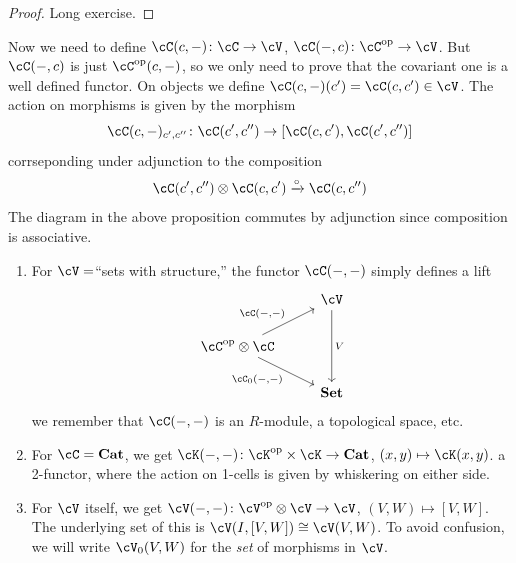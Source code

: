 \documentclass[a4paper,11pt,oneside,openany]{scrbook}
\begin{document}
\begin{proof}
	Long exercise.
\end{proof}
Now we need to define $ \cC(c,-) \from \cC \to \cV $, $ \cC(-,c)\from \cC^{\op}\to \cV $.
But $ \cC(-,c) $ is just $ \cC^{\op}(c,-) $, so we only need to prove that the covariant one is a well defined functor.
On objects we define $ \cC(c,-)(c') = \cC(c,c') \in \cV $.
The action on morphisms is given by the morphism
\begin{displaymath}
	\cC(c,-)_{c',c''} \from \cC(c',c'') \to [\cC(c,c'),\cC(c',c'')]
\end{displaymath}
corrseponding under adjunction to the composition
\begin{displaymath}
	\cC(c',c'')\otimes \cC(c,c') \xrightarrow{\circ} \cC(c,c'')
\end{displaymath}
The diagram in the above proposition commutes by adjunction since composition is associative.
\begin{exmp}
	\begin{enumerate}[label=\arabic*)]
		\item
		      For $ \cV =  $``sets with structure,'' the functor $ \cC(-,-) $ simply defines a lift
		      \begin{displaymath}
			      \begin{tikzcd}
				      & \cV \arrow[dd, "V"]\\
				      \cC^{\op}\otimes \cC \arrow[ur, "{\cC(-,-)}"]\arrow[dr, "{\cC_0(-,-)}"'] & \\
				      & \Set
			      \end{tikzcd}
		      \end{displaymath}
		      we remember that $ \cC(-,-) $ is an $ R $-module, a topological space, etc.
		\item
		      For $ \cC = \Cat $, we get $ \cK(-,-) \from \cK^{\op}\times \cK \to \Cat $, $ (x,y)\mapsto \cK(x,y) $.
		      a 2-functor, where the action on 1-cells is given by whiskering on either side.
		\item
		      For $ \cV $ itself, we get  $ \cV(-,-) \from \cV^{\op}\otimes \cV \to \cV $, $ (V,W)\mapsto [V,W] $.
		      The underlying set of this is $ \cV(I,[V,W]) \iso \cV(V,W) $.
		      To avoid confusion, we will write $ \cV_0(V,W) $ for the \emph{set} of morphisms in $ \cV $.
	\end{enumerate}
\end{exmp}
\end{document}
